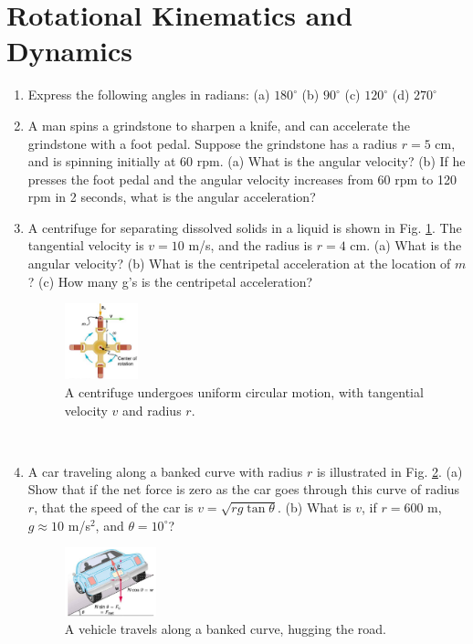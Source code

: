 \documentclass[10pt]{article}
\begin{document}
\section{Rotational Kinematics and Dynamics}
\begin{enumerate}
\item Express the following angles in radians: (a) $180^{\circ}$ (b) $90^{\circ}$ (c) $120^{\circ}$ (d) $270^{\circ}$ \\ \vspace{1.75cm}
\item A man spins a grindstone to sharpen a knife, and can accelerate the grindstone with a foot pedal.  Suppose the grindstone has a radius $r=5$ cm, and is spinning initially at 60 rpm.  (a) What is the angular velocity? (b) If he presses the foot pedal and the angular velocity increases from 60 rpm to 120 rpm in 2 seconds, what is the angular acceleration? \\ \vspace{2cm}
\item A centrifuge for separating dissolved solids in a liquid is shown in Fig. \ref{fig:cent}.  The tangential velocity is $v=10$ m/s, and the radius is $r=4$ cm.  (a) What is the angular velocity? (b) What is the centripetal acceleration at the location of $m$? (c) How many g's is the centripetal acceleration?
\begin{figure}[ht]
\centering
\includegraphics[width=0.2\textwidth]{figures/centrifuge.png}
\caption{\label{fig:cent} A centrifuge undergoes uniform circular motion, with tangential velocity $v$ and radius $r$.}
\end{figure} \\ \vspace{2cm}
\item A car traveling along a banked curve with radius $r$ is illustrated in Fig. \ref{fig:car}.  (a) Show that if the net force is zero as the car goes through this curve of radius $r$, that the speed of the car is $v = \sqrt{rg\tan\theta}$. (b) What is $v$, if $r=600$ m, $g\approx 10$ m/s$^2$, and $\theta = 10^{\circ}$?
\begin{figure}[ht]
\centering
\includegraphics[width=0.25\textwidth]{figures/car.png}
\caption{\label{fig:car} A vehicle travels along a banked curve, hugging the road.}
\end{figure} \\ \vspace{1cm}
\end{enumerate}
\end{document}
